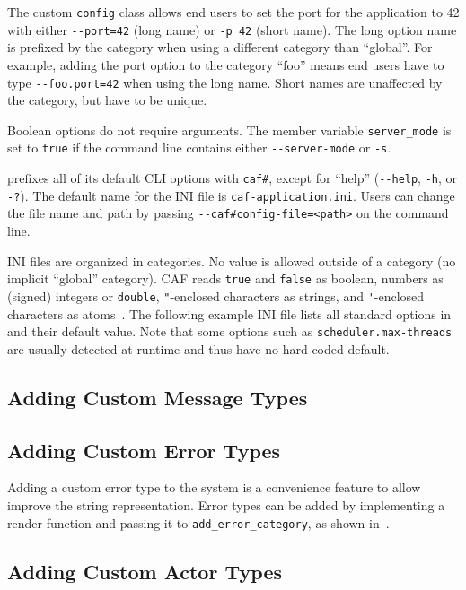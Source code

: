 The custom \lstinline^config^ class allows end users to set the port for the application to 42 with either \lstinline^--port=42^ (long name) or \lstinline^-p 42^ (short name). The long option name is prefixed by the category when using a different category than ``global''. For example, adding the port option to the category ``foo'' means end users have to type \lstinline^--foo.port=42^ when using the long name. Short names are unaffected by the category, but have to be unique.

Boolean options do not require arguments. The member variable \lstinline^server_mode^ is set to \lstinline^true^ if the command line contains either \lstinline^--server-mode^ or \lstinline^-s^.

\lib prefixes all of its default CLI options with \lstinline^caf#^, except for ``help'' (\lstinline^--help^, \lstinline^-h^, or \lstinline^-?^). The default name for the INI file is \lstinline^caf-application.ini^. Users can change the file name and path by passing \lstinline^--caf#config-file=<path>^ on the command line.

INI files are organized in categories. No value is allowed outside of a category (no implicit ``global'' category). CAF reads \lstinline^true^ and \lstinline^false^ as boolean, numbers as (signed) integers or \lstinline^double^, \lstinline^"^-enclosed characters as strings, and \lstinline^'^-enclosed characters as atoms~. The following example INI file lists all standard options in \lib and their default value. Note that some options such as \lstinline^scheduler.max-threads^ are usually detected at runtime and thus have no hard-coded default.



\subsection{Adding Custom Message Types}

\subsection{Adding Custom Error Types}

Adding a custom error type to the system is a convenience feature to allow improve the string representation. Error types can be added by implementing a render function and passing it to \lstinline{add_error_category}, as shown in~.

\subsection{Adding Custom Actor Types \experimental}
